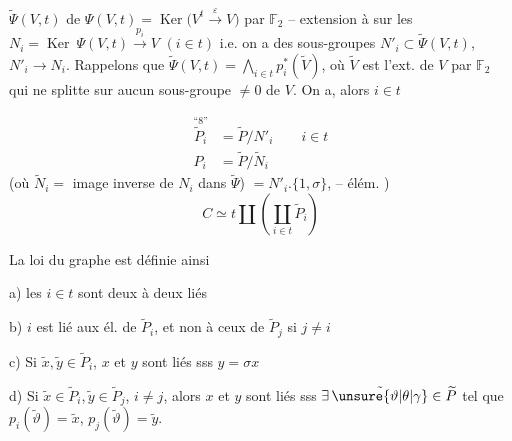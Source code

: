 $\widetilde\Psi(V,t)$ de $\Psi(V,t)=\operatorname{Ker}\bigl(V^t\overset{\varepsilon}{\longrightarrow}V\bigr)$ par $\mathbb F_2$  -- extension à   sur les $N_i=\operatorname{Ker}\ \Psi(V,t)\overset{p_i}{\longrightarrow}V$ $(i\in t)$ i.e. on a des sous-groupes $N'_i\subset\widetilde\Psi(V,t)$, $N'_i\longrightarrow N_i$. Rappelons que $\widetilde\Psi(V,t)=\bigwedge_{i\in t}p_i^*(\widetilde V)$, où $\widetilde V$ est l'ext. de $V$ par $\mathbb F_2$ qui ne splitte sur aucun sous-groupe $\ne0$ de $V$. On a, alors  $i\in t$

\[
\begin{aligned}
\overset{\text{``8''}}{\widetilde P_i}&=\widetilde P/N'_i\qquad i\in t\\
P_i&=\widetilde P/\widetilde N_i
\end{aligned}
\]
(où $\widetilde N_i=$ image inverse de $N_i$ dans $\widetilde\Psi$) $=N'_i.\{1,\sigma\}$, \unsure{$\sigma$} -- élém.  )
\[
C\simeq t\amalg\left(\coprod_{i\in t}\widetilde P_i\right)
\]

La loi du graphe est définie ainsi

a) les $i\in t$ sont deux à deux liés

b) $i$ est lié aux él. de $\widetilde P_i$, et non à ceux de $\widetilde P_j$ si $j\ne i$

c) Si  $\tilde x,\tilde y\in\widetilde P_i$, $x$ et $y$ sont liés sss $y=\sigma x$

d) Si $\tilde x\in\widetilde P_i,\tilde y\in\widetilde P_j$, $i\ne j$, alors $x$ et $y$ sont liés sss $\exists\,\tilde{\unsure{\vartheta|\theta|\gamma}}\in\widetilde P$ tel que  $p_i(\tilde\vartheta)=\tilde x$, $p_j(\tilde\vartheta)=\tilde y$.


